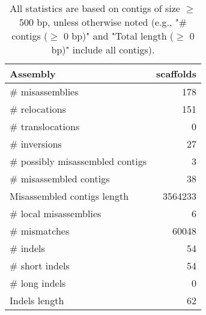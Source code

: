 \documentclass[12pt,a4paper]{article}
\begin{document}
\begin{table}[ht]
\begin{center}
\caption{All statistics are based on contigs of size $\geq$ 500 bp, unless otherwise noted (e.g., "\# contigs ($\geq$ 0 bp)" and "Total length ($\geq$ 0 bp)" include all contigs).}
\begin{tabular}{|l*{1}{|r}|}
\hline
Assembly & scaffolds \\ \hline
\# misassemblies & 178 \\ \hline
\hspace{5mm}\# relocations & 151 \\ \hline
\hspace{5mm}\# translocations & 0 \\ \hline
\hspace{5mm}\# inversions & 27 \\ \hline
\# possibly misassembled contigs & 3 \\ \hline
\# misassembled contigs & 38 \\ \hline
Misassembled contigs length & 3564233 \\ \hline
\# local misassemblies & 6 \\ \hline
\# mismatches & 60048 \\ \hline
\# indels & 54 \\ \hline
\hspace{5mm}\# short indels & 54 \\ \hline
\hspace{5mm}\# long indels & 0 \\ \hline
Indels length & 62 \\ \hline
\end{tabular}
\end{center}
\end{table}
\end{document}
